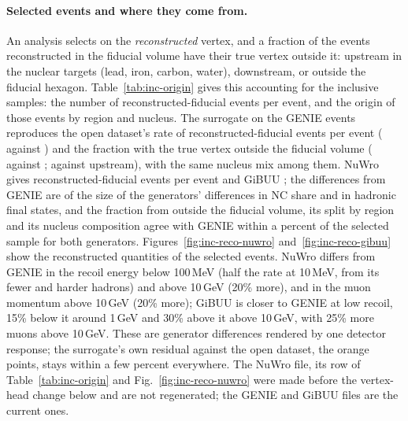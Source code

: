 \documentclass[11pt]{article}
\begin{document}
\paragraph{Selected events and where they come from.} An analysis selects on the \emph{reconstructed} vertex,
and a fraction of the events reconstructed in the fiducial volume have their true vertex outside it: upstream in
the nuclear targets (lead, iron, carbon, water), downstream, or outside the fiducial hexagon. Table~\ref{tab:inc-origin}
gives this accounting for the inclusive samples: the number of reconstructed-fiducial events per event, and the
origin of those events by region and nucleus. The surrogate on the GENIE events reproduces the open dataset's
rate of reconstructed-fiducial events per event (\nIncGenRecoFrac{} against \nIncRefRecoFrac{}) and the fraction
with the true vertex outside the fiducial volume (\nIncGBGenOutFrac{} against \nIncGBRefOutFrac{};
\nIncGBGenUpstream{} against \nIncGBRefUpstream{} upstream), with the same nucleus mix among them. NuWro gives
\nIncNuwRecoFrac{} reconstructed-fiducial events per event and GiBUU \nIncGibRecoFrac{}; the differences from
GENIE are of the size of the generators' differences in NC share and in hadronic final states, and the fraction
from outside the fiducial volume, its split by region and its nucleus composition agree with GENIE within a
percent of the selected sample for both generators. Figures~\ref{fig:inc-reco-nuwro} and~\ref{fig:inc-reco-gibuu}
show the reconstructed quantities of the selected events. NuWro differs from GENIE in the recoil energy below
100\,MeV (half the rate at 10\,MeV, from its fewer and harder hadrons) and above 10\,GeV (20\% more), and in the muon momentum above 10\,GeV (20\% more);
GiBUU is closer to GENIE at low recoil, 15\% below it around 1\,GeV and 30\% above it above 10\,GeV, with 25\%
more muons above 10\,GeV. These are generator differences rendered by one detector response; the surrogate's own
residual against the open dataset, the orange points, stays within a few percent everywhere. The NuWro file,
its row of Table~\ref{tab:inc-origin} and Fig.~\ref{fig:inc-reco-nuwro} were made before the vertex-head change
below and are not regenerated; the GENIE and GiBUU files are the current ones.
\end{document}
